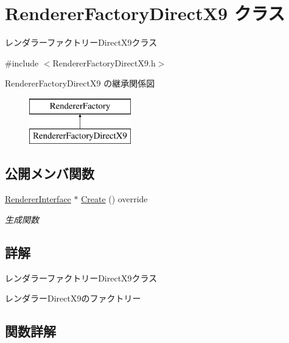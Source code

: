 \hypertarget{class_renderer_factory_direct_x9}{}\section{Renderer\+Factory\+Direct\+X9 クラス}
\label{class_renderer_factory_direct_x9}


レンダラーファクトリー\+Direct\+X9クラス  




{\ttfamily \#include $<$Renderer\+Factory\+Direct\+X9.\+h$>$}

Renderer\+Factory\+Direct\+X9 の継承関係図\begin{figure}[H]
\begin{center}
\leavevmode
\includegraphics[height=2.000000cm]{class_renderer_factory_direct_x9}
\end{center}
\end{figure}
\subsection*{公開メンバ関数}
\begin{DoxyCompactItemize}
\item 
\mbox{\hyperlink{class_renderer_interface}{Renderer\+Interface}} $\ast$ \mbox{\hyperlink{class_renderer_factory_direct_x9_aa64ac54f3efe121f531a28dd3b7690e3}{Create}} () override
\begin{DoxyCompactList}\small\item\em 生成関数 \end{DoxyCompactList}\end{DoxyCompactItemize}


\subsection{詳解}
レンダラーファクトリー\+Direct\+X9クラス 

レンダラー\+Direct\+X9のファクトリー 

\subsection{関数詳解}
\mbox{\label{class_renderer_factory_direct_x9_aa64ac54f3efe121f531a28dd3b7690e3}} 
